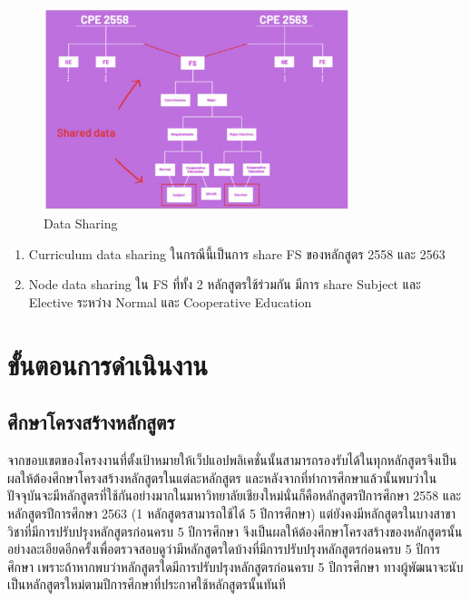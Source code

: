\begin{figure}[H]
  \begin{center}
    \includegraphics[width=0.8\textwidth]{model.png}
    \caption{Data Sharing}
    \label{fig:model}
  \end{center}
\end{figure}

\begin{enumerate}
  \item Curriculum data sharing ในกรณีนี้เป็นการ share FS ของหลักสูตร 2558 และ 2563
  \item Node data sharing ใน FS ที่ทั้ง 2 หลักสูตรใช้ร่วมกัน มีการ share Subject และ Elective ระหว่าง Normal และ
  Cooperative Education
\end{enumerate}

\section{ขั้นตอนการดำเนินงาน}
\subsection{ศึกษาโครงสร้างหลักสูตร}
จากขอบเขตของโครงงานที่ตั้งเป้าหมายให้เว็ปแอปพลิเคชั่นนั้นสามารถรองรับได้ในทุกหลักสูตรจึงเป็นผลให้ต้องศึกษาโครงสร้างหลักสูตรในแต่ละหลักสูตร 
และหลังจากที่ทําการศึกษาแล้วนั้นพบว่าในปัจจุบันจะมีหลักสูตรที่ใช้กันอย่างมากในมหาวิทยาลัยเชียงใหม่นั่นก็คือหลักสูตรปีการศึกษา 2558 และหลักสูตรปีการศึกษา 2563 (1 หลักสูตรสามารถใช้ได้ 5 ปีการศึกษา) 
แต่ยังคงมีหลักสูตรในบางสาขาวิชาที่มีการปรับปรุงหลักสูตรก่อนครบ 5 ปีการศึกษา จึงเป็นผลให้ต้องศึกษาโครงสร้างของหลักสูตรนั้นอย่างละเอียดอีกครั้งเพื่อตรวจสอบดูว่ามีหลักสูตรใดบ้างที่มีการปรับปรุงหลักสูตรก่อนครบ 5 ปีการศึกษา 
เพราะถ้าหากพบว่าหลักสูตรใดมีการปรับปรุงหลักสูตรก่อนครบ 5 ปีการศึกษา ทางผู้พัฒนาจะนับเป็นหลักสูตรใหม่ตามปีการศึกษาที่ประกาศใช้หลักสูตรนั้นทันที
